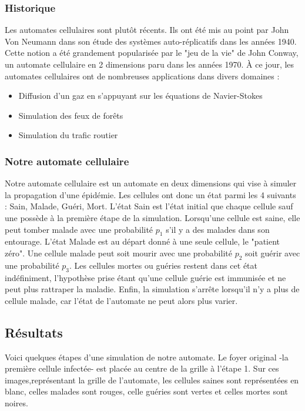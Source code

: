 \documentclass{article}
\begin{document}
\subsubsection{Historique}
	Les automates cellulaires sont plutôt récents. Ils ont été mis au point par John Von Neumann dans son étude des systèmes auto-réplicatifs dans les années 1940. Cette notion a été grandement popularisée par le "jeu de la vie" de John Conway, un automate cellulaire en 2 dimensions paru dans les années 1970. À ce jour, les automates cellulaires ont de nombreuses applications dans divers domaines :
	\begin{itemize}
	\item Diffusion d'un gaz en s'appuyant sur les équations de Navier-Stokes
	\item Simulation des feux de forêts
	\item Simulation du trafic routier
	\end{itemize}

\subsubsection{Notre automate cellulaire}
	Notre automate cellulaire est un automate en deux dimensions qui vise à simuler la propagation d'une épidémie. Les cellules ont donc un état parmi les 4 suivants : Sain, Malade, Guéri, Mort. L'état Sain est l'état initial que chaque cellule sauf une possède à la première étape de la simulation. Lorsqu'une cellule est saine, elle peut tomber malade avec une probabilité $p_1$ s'il y a des malades dans son entourage. L'état Malade est au départ donné à une seule cellule, le "patient zéro". Une cellule malade peut soit mourir avec une probabilité $p_2$ soit guérir avec une probabilité $p_3$. Les cellules mortes ou guéries restent dans cet état indéfiniment, l'hypothèse prise étant qu'une cellule guérie est immunisée et ne peut plus rattraper la maladie. Enfin, la simulation s'arrête lorsqu'il n'y a plus de cellule malade, car l'état de l'automate ne peut alors plus varier.


\subsection{Résultats}

Voici quelques étapes d'une simulation de notre automate. Le foyer original -la première cellule infectée- est placée au centre de la grille à l'étape 1. Sur ces images,représentant la grille de l'automate, les cellules saines sont représentées en blanc, celles malades sont rouges, celle guéries sont vertes et celles mortes sont noires.
\end{document}
